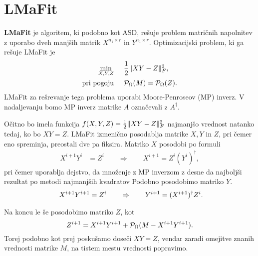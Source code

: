\section{LMaFit}
\textbf{LMaFit} je algoritem, ki podobno kot ASD, rešuje problem matričnih napolnitev z uporabo dveh manjših matrik $X^{n_1 \times r}$ in $Y^{n_1 \times r}$.
Optimizacijski problem, ki ga rešuje LMaFit je
\begin{align*}
    \min_{X, Y, Z}& \hspace{0.5cm} \frac{1}{2}\lVert XY - Z\rVert_F^2,\\
    \text{pri pogoju}& \hspace{0.5cm} \mathcal{P}_\Omega(M) = \mathcal{P}_\Omega(Z).
\end{align*}
LMaFit za rešrevanje tega problema uporabi
Moore-Penroseov (MP) inverz. V nadaljevanju bomo MP inverz matrike $A$ označevali z $A^\dagger$.

Očitno bo imela funkcija $f(X,Y,Z) = \frac{1}{2}\lVert XY - Z\rVert_F^2$ najmanjšo vrednost natanko tedaj, ko bo $XY = Z$. 
LMaFit izmenično posodablja matrike $X, Y$ in $Z$, pri čemer eno spreminja, preostali dve pa fiksira. Matriko $X$ posodobi po formuli
\begin{align*}
    X^{i+1}Y^{i}&= Z^{i}
    \qquad 
    \Rightarrow
    \qquad
    X^{i+1} = Z^{i}(Y^i)^\dagger,
\end{align*}
pri čemer uporablja dejstvo, da množenje z MP inverzom z desne 
da najboljši rezultat po metodi najmanjših kvadratov 
Podobno posodobimo matriko $Y$.
\begin{align*}
    \hspace{0.5cm} X^{i+1}Y^{i+1} &= Z^{i}    \qquad 
    \Rightarrow
    \qquad
    Y^{i+1} = (X^{i+1})^\dagger Z^{i}.
\end{align*}

Na koncu le še posodobimo matriko $Z$, kot
\[
    Z^{i+1} = X^{i+1}Y^{i+1} + \mathcal{P}_\Omega(M - X^{i+1}Y^{i+1}).
\]
Torej podobno kot prej poskušamo doseči $XY = Z$, vendar zaradi omejitve znanih vrednosti matrike $M$, na tistem mestu vrednosti popravimo.
